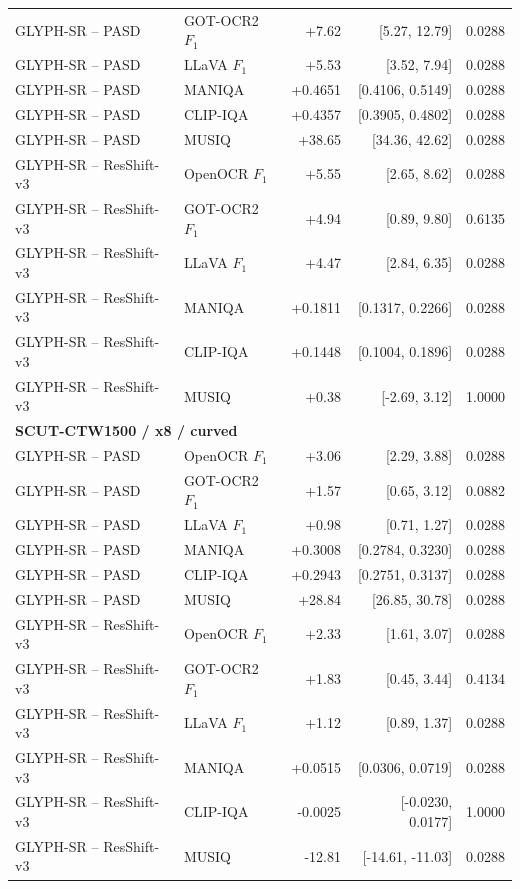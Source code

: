 \begin{longtable}{llrrr}
GLYPH-SR -- PASD & GOT-OCR2 $F_1$ & +7.62 & [5.27, 12.79] & 0.0288 \\
GLYPH-SR -- PASD & LLaVA $F_1$ & +5.53 & [3.52, 7.94] & 0.0288 \\
GLYPH-SR -- PASD & MANIQA & +0.4651 & [0.4106, 0.5149] & 0.0288 \\
GLYPH-SR -- PASD & CLIP-IQA & +0.4357 & [0.3905, 0.4802] & 0.0288 \\
GLYPH-SR -- PASD & MUSIQ & +38.65 & [34.36, 42.62] & 0.0288 \\
GLYPH-SR -- ResShift-v3 & OpenOCR $F_1$ & +5.55 & [2.65, 8.62] & 0.0288 \\
GLYPH-SR -- ResShift-v3 & GOT-OCR2 $F_1$ & +4.94 & [0.89, 9.80] & 0.6135 \\
GLYPH-SR -- ResShift-v3 & LLaVA $F_1$ & +4.47 & [2.84, 6.35] & 0.0288 \\
GLYPH-SR -- ResShift-v3 & MANIQA & +0.1811 & [0.1317, 0.2266] & 0.0288 \\
GLYPH-SR -- ResShift-v3 & CLIP-IQA & +0.1448 & [0.1004, 0.1896] & 0.0288 \\
GLYPH-SR -- ResShift-v3 & MUSIQ & +0.38 & [-2.69, 3.12] & 1.0000 \\
\midrule
\multicolumn{5}{l}{\textbf{SCUT-CTW1500 / x8 / curved}}\\
\midrule
GLYPH-SR -- PASD & OpenOCR $F_1$ & +3.06 & [2.29, 3.88] & 0.0288 \\
GLYPH-SR -- PASD & GOT-OCR2 $F_1$ & +1.57 & [0.65, 3.12] & 0.0882 \\
GLYPH-SR -- PASD & LLaVA $F_1$ & +0.98 & [0.71, 1.27] & 0.0288 \\
GLYPH-SR -- PASD & MANIQA & +0.3008 & [0.2784, 0.3230] & 0.0288 \\
GLYPH-SR -- PASD & CLIP-IQA & +0.2943 & [0.2751, 0.3137] & 0.0288 \\
GLYPH-SR -- PASD & MUSIQ & +28.84 & [26.85, 30.78] & 0.0288 \\
GLYPH-SR -- ResShift-v3 & OpenOCR $F_1$ & +2.33 & [1.61, 3.07] & 0.0288 \\
GLYPH-SR -- ResShift-v3 & GOT-OCR2 $F_1$ & +1.83 & [0.45, 3.44] & 0.4134 \\
GLYPH-SR -- ResShift-v3 & LLaVA $F_1$ & +1.12 & [0.89, 1.37] & 0.0288 \\
GLYPH-SR -- ResShift-v3 & MANIQA & +0.0515 & [0.0306, 0.0719] & 0.0288 \\
GLYPH-SR -- ResShift-v3 & CLIP-IQA & -0.0025 & [-0.0230, 0.0177] & 1.0000 \\
GLYPH-SR -- ResShift-v3 & MUSIQ & -12.81 & [-14.61, -11.03] & 0.0288 \\

\end{longtable}
